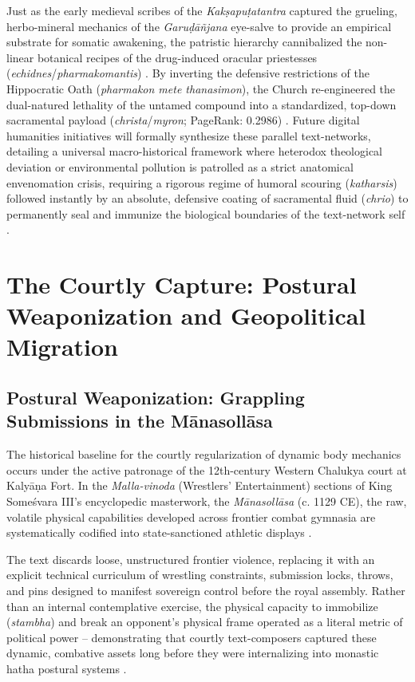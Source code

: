 \documentclass[11pt,twoside,letterpaper]{article}
\begin{document}
Just as the early medieval scribes of the \textit{Kakṣapuṭatantra} captured the grueling, herbo-mineral mechanics of the \textit{Garuḍāñjana} eye-salve to provide an empirical substrate for somatic awakening, the patristic hierarchy cannibalized the non-linear botanical recipes of the drug-induced oracular priestesses (\textit{echidnes}/\textit{pharmakomantis}) \citep{Wujastyk2025, mccartneyforthcomingD}. By inverting the defensive restrictions of the Hippocratic Oath (\textit{pharmakon mete thanasimon}), the Church re-engineered the dual-natured lethality of the untamed compound into a standardized, top-down sacramental payload (\textit{christa}/\textit{myron}; PageRank: 0.2986) \citep{mccartneyforthcomingD}. Future digital humanities initiatives will formally synthesize these parallel text-networks, detailing a universal macro-historical framework where heterodox theological deviation or environmental pollution is patrolled as a strict anatomical envenomation crisis, requiring a rigorous regime of humoral scouring (\textit{katharsis}) followed instantly by an absolute, defensive coating of sacramental fluid (\textit{chrio}) to permanently seal and immunize the biological boundaries of the text-network self \citep{mccartneyforthcomingD}.

\section{The Courtly Capture: Postural Weaponization and Geopolitical Migration}

\subsection{Postural Weaponization: Grappling Submissions in the Mānasollāsa}
The historical baseline for the courtly regularization of dynamic body mechanics occurs under the active patronage of the 12th-century Western Chalukya court at Kalyāṇa Fort. In the \textit{Malla-vinoda} (Wrestlers’ Entertainment) sections of King Someśvara III’s encyclopedic masterwork, the \textit{Mānasollāsa} (c. 1129 CE), the raw, volatile physical capabilities developed across frontier combat gymnasia are systematically codified into state-sanctioned athletic displays \citep{Manasollasa2}. 

The text discards loose, unstructured frontier violence, replacing it with an explicit technical curriculum of wrestling constraints, submission locks, throws, and pins designed to manifest sovereign control before the royal assembly. Rather than an internal contemplative exercise, the physical capacity to immobilize (\textit{stambha}) and break an opponent’s physical frame operated as a literal metric of political power – demonstrating that courtly text-composers captured these dynamic, combative assets long before they were internalizing into monastic hatha postural systems \citep{OHanlon2007}.
\end{document}
